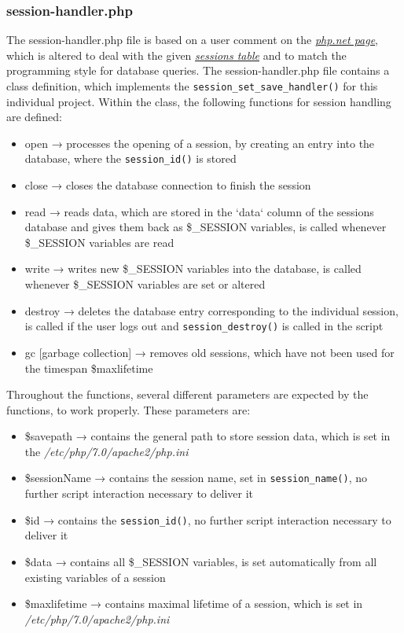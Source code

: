 \subsubsection{session-handler.php}\label{session-handler}
The session-handler.php file is based on a user comment on the \href{https://secure.php.net/manual/de/function.session-set-save-handler.php#118225}{\textit{php.net page}}, 
which is altered to deal with the given \hyperref[sessions_database]{\textit{sessions table}} and to match the programming style for database queries. The session-handler.php file 
contains a class definition, which implements the \texttt{session\_set\_save\_handler()} for this individual project. Within the class, the following functions for session handling 
are defined:
\begin{itemize}
\item open → processes the opening of a session, by creating an entry into the database, where the \texttt{session\_id()} is stored
\item close → closes the database connection to finish the session
\item read → reads data, which are stored in the `data` column of the sessions database and gives them back as \$\_SESSION variables, is called whenever \$\_SESSION variables are read
\item write → writes new \$\_SESSION variables into the database, is called whenever \$\_SESSION variables are set or altered
\item destroy → deletes the database entry corresponding to the individual session, is called if the user logs out and \texttt{session\_destroy()} is called in the script
\item gc [garbage collection] → removes old sessions, which have not been used for the timespan \$maxlifetime
\end{itemize}
Throughout the functions, several different parameters are expected by the functions, to work properly. These parameters are:
\begin{itemize}
 \item \$savepath → contains the general path to store session data, which is set in the \emph{/etc/php/7.0/apache2/php.ini}
 \item \$sessionName → contains the session name, set in \texttt{session\_name()}, no further script interaction necessary to deliver it
 \item \$id → contains the \texttt{session\_id()}, no further script interaction necessary to deliver it
 \item \$data → contains all \$\_SESSION variables, is set automatically from all existing variables of a session
 \item \$maxlifetime → contains maximal lifetime of a session, which is set in \emph{/etc/php/7.0/apache2/php.ini}
\end{itemize}
